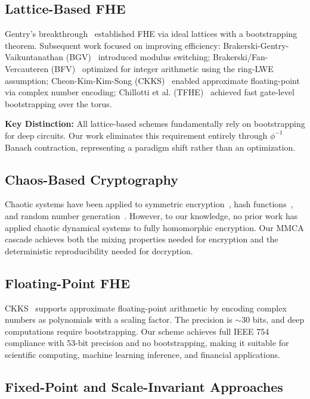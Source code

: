 \documentclass[11pt,a4paper]{article}
\begin{document}
\subsection{Lattice-Based FHE}

Gentry's breakthrough~\cite{gentry2009} established FHE via ideal lattices with a bootstrapping theorem. Subsequent work focused on improving efficiency: Brakerski-Gentry-Vaikuntanathan (BGV)~\cite{bgv2014} introduced modulus switching; Brakerski/Fan-Vercauteren (BFV)~\cite{bfv2012} optimized for integer arithmetic using the ring-LWE assumption; Cheon-Kim-Kim-Song (CKKS)~\cite{ckks2017} enabled approximate floating-point via complex number encoding; Chillotti et al. (TFHE)~\cite{tfhe2016, chillotti2021} achieved fast gate-level bootstrapping over the torus.

\textbf{Key Distinction:} All lattice-based schemes fundamentally rely on bootstrapping for deep circuits. Our work eliminates this requirement entirely through $\phi^{-1}$ Banach contraction, representing a paradigm shift rather than an optimization.

\subsection{Chaos-Based Cryptography}

Chaotic systems have been applied to symmetric encryption~\cite{baptista1998, fridrich1998}, hash functions~\cite{kwok2010}, and random number generation~\cite{strogatz2018}. However, to our knowledge, no prior work has applied chaotic dynamical systems to fully homomorphic encryption. Our MMCA cascade achieves both the mixing properties needed for encryption and the deterministic reproducibility needed for decryption.

\subsection{Floating-Point FHE}

CKKS~\cite{ckks2017} supports approximate floating-point arithmetic by encoding complex numbers as polynomials with a scaling factor. The precision is $\sim$30 bits, and deep computations require bootstrapping. Our scheme achieves full IEEE 754 compliance with 53-bit precision and no bootstrapping, making it suitable for scientific computing, machine learning inference, and financial applications.

\subsection{Fixed-Point and Scale-Invariant Approaches}
\end{document}

